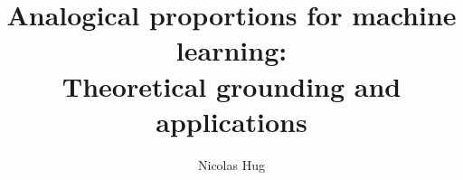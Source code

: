 \documentclass{book}
\title{Analogical proportions for machine learning:\\Theoretical grounding and
applications}
\author{Nicolas Hug}
\begin{document}
\makeflyleaf
\end{document}
